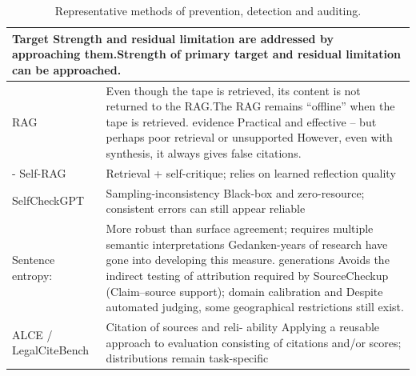 \begin{table}[htbp]\caption{Representative methods of prevention, detection and auditing.}\centering\footnotesize\setlength{\tabcolsep}{2pt}\begin{tabular}{@{}p{.36\linewidth}p{.61\linewidth}@{}}\toprule
\multicolumn{2}{p{.96\linewidth}}{Target Strength and residual limitation are addressed by approaching them.Strength of primary target and residual limitation can be approached.} \\ \midrule
RAG \cite{ref14,ref19} & Even though the tape is retrieved, its content is not returned to the RAG.The RAG remains “offline” when the tape is retrieved. evidence Practical and effective – but perhaps poor retrieval or unsupported However, even with synthesis, it always gives false citations. \\
- Self-RAG \cite{ref1} & Retrieval + self-critique; relies on learned reflection quality \\
SelfCheckGPT \cite{ref15} & Sampling-inconsistency Black-box and zero-resource; consistent errors can still appear reliable \\
Sentence entropy: & More robust than surface agreement; requires multiple semantic interpretations \cite{ref7} Gedanken-years of research have gone into developing this measure. generations Avoids the indirect testing of attribution required by SourceCheckup \cite{ref23} (Claim–source support); domain calibration and Despite automated judging, some geographical restrictions still exist. \\
ALCE / LegalCiteBench \cite{ref5,ref8} & Citation of sources and reli- ability Applying a reusable approach to evaluation consisting of citations and/or scores; distributions remain task-specific \\\bottomrule\end{tabular}\end{table}